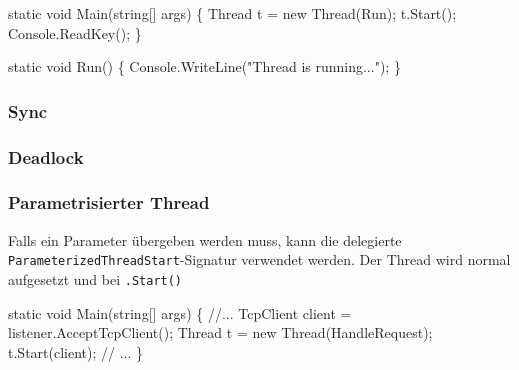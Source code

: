 \documentclass[
  9pt,
  a4paperpaper,
  DIV=11]{scrartcl}
\newenvironment{Shaded}{}{}
\newcommand{\CommentTok}[1]{\textcolor[rgb]{0.42,0.45,0.49}{#1}}
\newcommand{\DataTypeTok}[1]{\textcolor[rgb]{0.84,0.23,0.29}{#1}}
\newcommand{\FunctionTok}[1]{\textcolor[rgb]{0.44,0.26,0.76}{#1}}
\newcommand{\KeywordTok}[1]{\textcolor[rgb]{0.84,0.23,0.29}{#1}}
\newcommand{\NormalTok}[1]{\textcolor[rgb]{0.14,0.16,0.18}{#1}}
\newcommand{\OperatorTok}[1]{\textcolor[rgb]{0.14,0.16,0.18}{#1}}
\newcommand{\StringTok}[1]{\textcolor[rgb]{0.01,0.18,0.38}{#1}}
\numberwithin{equation}{section}
\begin{document}
\begin{multicols}{2}
\begin{Shaded}
\begin{Highlighting}[]
\KeywordTok{static} \DataTypeTok{void} \FunctionTok{Main}\OperatorTok{(}\DataTypeTok{string}\OperatorTok{[]}\NormalTok{ args}\OperatorTok{)} \OperatorTok{\{}
\NormalTok{  Thread t }\OperatorTok{=} \KeywordTok{new} \FunctionTok{Thread}\OperatorTok{(}\NormalTok{Run}\OperatorTok{);}
\NormalTok{  t}\OperatorTok{.}\FunctionTok{Start}\OperatorTok{();}
\NormalTok{  Console}\OperatorTok{.}\FunctionTok{ReadKey}\OperatorTok{();}
\OperatorTok{\}}

\KeywordTok{static} \DataTypeTok{void} \FunctionTok{Run}\OperatorTok{()} \OperatorTok{\{}
\NormalTok{  Console}\OperatorTok{.}\FunctionTok{WriteLine}\OperatorTok{(}\StringTok{"Thread is running..."}\OperatorTok{);}
\OperatorTok{\}}
\end{Highlighting}
\end{Shaded}

\hypertarget{sync}{%
\subsubsection{Sync}\label{sync}}

\hypertarget{deadlock}{%
\subsubsection{Deadlock}\label{deadlock}}

\hypertarget{parametrisierter-thread}{%
\subsubsection{Parametrisierter Thread}\label{parametrisierter-thread}}

Falls ein Parameter übergeben werden muss, kann die delegierte
\texttt{ParameterizedThreadStart}-Signatur verwendet werden. Der Thread
wird normal aufgesetzt und bei \texttt{.Start()}

\begin{Shaded}
\begin{Highlighting}[]
\KeywordTok{static} \DataTypeTok{void} \FunctionTok{Main}\OperatorTok{(}\DataTypeTok{string}\OperatorTok{[]}\NormalTok{ args}\OperatorTok{)}
\OperatorTok{\{}
  \CommentTok{//...}
\NormalTok{  TcpClient client }\OperatorTok{=}\NormalTok{ listener}\OperatorTok{.}\FunctionTok{AcceptTcpClient}\OperatorTok{();}
\NormalTok{  Thread t }\OperatorTok{=} \KeywordTok{new} \FunctionTok{Thread}\OperatorTok{(}\NormalTok{HandleRequest}\OperatorTok{);}
\NormalTok{  t}\OperatorTok{.}\FunctionTok{Start}\OperatorTok{(}\NormalTok{client}\OperatorTok{);}
  \CommentTok{// ...}
\OperatorTok{\}}


\end{Highlighting}
\end{Shaded}
\end{multicols}
\end{document}
